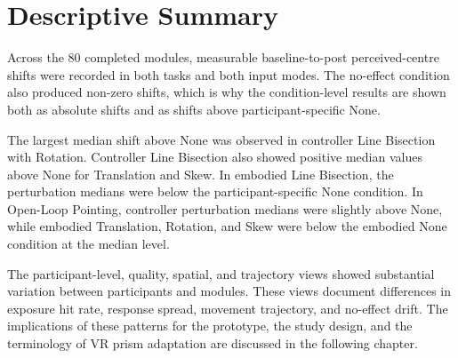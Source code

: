 \section{Descriptive Summary}
\label{sec:results-descriptive-summary}

Across the 80 completed modules, measurable baseline-to-post perceived-centre shifts were recorded in both tasks and both input modes. The no-effect condition also produced non-zero shifts, which is why the condition-level results are shown both as absolute shifts and as shifts above participant-specific None.

The largest median shift above None was observed in controller Line Bisection with Rotation. Controller Line Bisection also showed positive median values above None for Translation and Skew. In embodied Line Bisection, the perturbation medians were below the participant-specific None condition. In Open-Loop Pointing, controller perturbation medians were slightly above None, while embodied Translation, Rotation, and Skew were below the embodied None condition at the median level.

The participant-level, quality, spatial, and trajectory views showed substantial variation between participants and modules. These views document differences in exposure hit rate, response spread, movement trajectory, and no-effect drift. The implications of these patterns for the prototype, the study design, and the terminology of VR prism adaptation are discussed in the following chapter.
